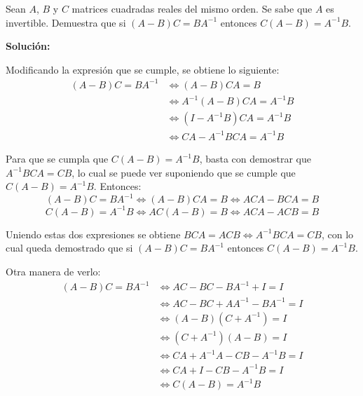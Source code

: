 \documentclass[../../main.tex]{subfiles}
\begin{document}
  \begin{shaded}
    Sean $A$, $B$ y $C$ matrices cuadradas reales del mismo orden. Se sabe que $A$ es invertible. Demuestra que si $(A - B) C = B A^{-1}$ entonces $C (A - B) = A^{-1} B$.
  \end{shaded}

  \textbf{Solución:}

  Modificando la expresión que se cumple, se obtiene lo siguiente:
  \begin{equation*}
    \begin{split}
      (A - B) C = B A^{-1} & \iff 
      (A - B) C A = B \\ & \iff
      A^{-1} (A - B) C A = A^{-1} B \\ & \iff
      (I - A^{-1} B) C A = A^{-1} B \\ & \iff
      C A - A^{-1} B C A = A^{-1} B
    \end{split}
  \end{equation*}

  Para que se cumpla que $C (A - B) = A^{-1} B$, basta con demostrar que $A^{-1} B C A = C B$, lo cual se puede ver suponiendo que se cumple que $C (A - B) = A^{-1} B$. Entonces:
  $$
  (A - B) C = B A^{-1} \iff (A - B) C A = B \iff A C A - B C A = B
  $$
  $$
  C (A - B) = A^{-1} B \iff A C (A - B) = B \iff A C A - A C B = B
  $$

  Uniendo estas dos expresiones se obtiene $B C A = A C B \iff A^{-1} B C A = C B$, con lo cual queda demostrado que si $(A - B) C = B A^{-1}$ entonces $C (A - B) = A^{-1} B$.

  Otra manera de verlo:
  \begin{equation*}
    \begin{split}
      (A - B) C = B A^{-1} & \iff 
      A C - B C - B A^{-1} + I = I \\ & \iff
      A C - B C + A A^{-1} - B A^{-1} = I \\ & \iff
      (A - B) (C + A^{-1}) = I \\ & \iff
      (C + A^{-1}) (A - B) = I \\ & \iff
      C A + A^{-1} A - C B - A^{-1} B = I \\ & \iff
      C A + I - C B - A^{-1} B = I \\ & \iff
      C (A - B) = A^{-1} B
    \end{split}
  \end{equation*}
\end{document}
